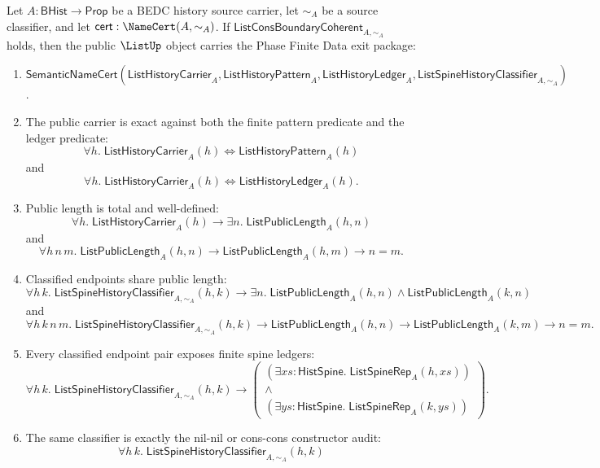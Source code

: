 \begin{theorem}
\label{thm:list-public-finite-data-exit-package}
Let $A:\mathsf{BHist}\to\mathsf{Prop}$ be a BEDC history source carrier, let
$\sim_A$ be a source classifier, and let
$\mathsf{cert}:\NameCert(A,\sim_A)$. If
$\mathsf{ListConsBoundaryCoherent}_{A,\sim_A}$ holds, then the public
$\ListUp$ object carries the Phase Finite Data exit package:
\begin{enumerate}
  \item
  $\mathsf{SemanticNameCert}(\mathsf{ListHistoryCarrier}_A,
  \mathsf{ListHistoryPattern}_A,
  \mathsf{ListHistoryLedger}_A,
  \mathsf{ListSpineHistoryClassifier}_{A,\sim_A})$.
  \item
  The public carrier is exact against both the finite pattern predicate and the
  ledger predicate:
  $$
  \forall h.\;
  \mathsf{ListHistoryCarrier}_A(h)
  \Longleftrightarrow
  \mathsf{ListHistoryPattern}_A(h)
  $$
  and
  $$
  \forall h.\;
  \mathsf{ListHistoryCarrier}_A(h)
  \Longleftrightarrow
  \mathsf{ListHistoryLedger}_A(h).
  $$
  \item
  Public length is total and well-defined:
  $$
  \forall h.\;\mathsf{ListHistoryCarrier}_A(h)\to
  \exists n.\;\mathsf{ListPublicLength}_A(h,n)
  $$
  and
  $$
  \forall h\,n\,m.\;\mathsf{ListPublicLength}_A(h,n)\to
  \mathsf{ListPublicLength}_A(h,m)\to n=m.
  $$
  \item
  Classified endpoints share public length:
  $$
  \forall h\,k.\;\mathsf{ListSpineHistoryClassifier}_{A,\sim_A}(h,k)\to
  \exists n.\;\mathsf{ListPublicLength}_A(h,n)\land
  \mathsf{ListPublicLength}_A(k,n)
  $$
  and
  $$
  \forall h\,k\,n\,m.\;
  \mathsf{ListSpineHistoryClassifier}_{A,\sim_A}(h,k)\to
  \mathsf{ListPublicLength}_A(h,n)\to
  \mathsf{ListPublicLength}_A(k,m)\to n=m.
  $$
  \item
  Every classified endpoint pair exposes finite spine ledgers:
  $$
  \forall h\,k.\;\mathsf{ListSpineHistoryClassifier}_{A,\sim_A}(h,k)\to
  \left(
  \begin{array}{l}
  (\exists xs:\mathsf{HistSpine}.\;\mathsf{ListSpineRep}_A(h,xs))\\
  \land\\
  (\exists ys:\mathsf{HistSpine}.\;\mathsf{ListSpineRep}_A(k,ys))
  \end{array}
  \right).
  $$
  \item
  The same classifier is exactly the nil-nil or cons-cons constructor audit:
  $$
  \forall h\,k.\;
  \mathsf{ListSpineHistoryClassifier}_{A,\sim_A}(h,k)
$$
\end{enumerate}
\end{theorem}
